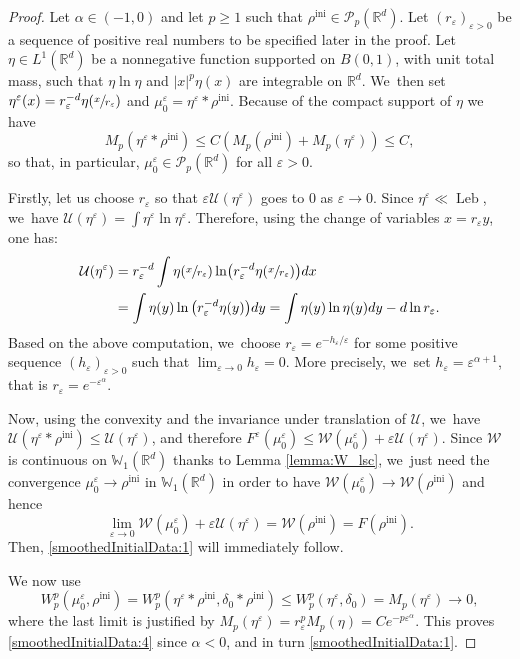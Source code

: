 \documentclass[JEP,XML,SOM,Unicode, NoFloatCountersInSection,published]{cedram}
\newcommand{\ini}{\mathrm{ini}}
\DeclareMathOperator{\Leb}{Leb}
\def\RR{\mathbb{R}}
\def\WW{\mathbb{W}}
\def\eps{\varepsilon}
\def\calP{{\mathcal P}}
\def\calU{{\mathcal U}}
\def\calW{{\mathcal W}}
\theoremstyle{plain}
\theoremstyle{definition}
\begin{document}
\begin{proof}
Let $\alpha \in (-1,0)$ and let $p \geq 1$ such that $\rho^{\ini} \in \calP_p(\RR^d)$. Let $(r_\eps)_{\eps > 0}$ be a sequence of positive real numbers to be specified later in the proof. Let $\eta \in L^1(\RR^d)$ be a nonnegative function supported on $B(0,1)$, with unit total mass, such that $\eta \ln \eta$ and $|x|^p \eta(x)$ are integrable on $\RR^d$. We~then set $\eta^\eps(x) = r_\eps^{-d} \eta(\sfrac{x}{r_\eps})$ and $\mu_0^\eps = \eta^\eps * \rho^{\ini}$. Because of the compact support of $\eta$ we have
\[
M_p(\eta^\eps * \rho^{\ini}) \leq C(M_p(\rho^{\ini})+M_p(\eta^\eps))\leq C,
\]
so that, in particular, $\mu_0^\eps \in \calP_p(\RR^d)$ for all $\eps>0$.

Firstly, let us choose $r_\eps$ so that $\eps \calU(\eta^\eps)$ goes to 0 as $\eps \to 0$. Since $\eta^\eps \ll \Leb$, we~have $\calU(\eta^\eps) = \int \eta^\eps \ln \eta^\eps$. Therefore, using the change of variables $x = r_\eps y$, one has:
\[
\begin{aligned}
\calU(\eta^\eps) &= r_\eps^{-d} \int \eta(\sfrac{x}{r_\eps}) \ln \bigl( r_\eps^{-d} \eta(\sfrac{x}{r_\eps}) \bigr) dx\\
& = \int \eta(y) \ln \big(r_\eps^{-d} \eta(y)\big) dy 
= \int \eta(y) \ln \eta(y) dy - d \ln r_\eps.
\end{aligned}
\]
Based on the above computation, we~choose $r_\eps = e^{-h_\eps / \eps}$ for some positive sequence $(h_\eps)_{\eps>0}$ such that $\lim_{\eps \to 0} h_\eps = 0$. More precisely, we~set $h_\eps = \eps^{\alpha + 1}$, that is $r_\eps = e^{-\eps^\alpha}$.

Now, using the convexity and the invariance under translation of $\calU$, we~have \hbox{$\calU(\eta^\eps * \rho^{\ini}) \leq \calU(\eta^\eps)$}, and therefore $F^\eps(\mu_0^\eps) \leq \calW(\mu_0^\eps) + \eps \calU(\eta^\eps)$. Since $\calW$ is continuous on $\WW_1(\RR^d)$ thanks to Lemma \ref{lemma:W_lsc}, we~just need the convergence $\mu_0^\eps\to\rho^{\ini}$ in $\WW_1(\RR^d)$ in order to have $\calW(\mu_0^\eps) \to \calW(\rho^{\ini})$ and hence
\[
\lim_{\eps \to 0} \calW(\mu_0^\eps) + \eps \calU(\eta^\eps) = \calW(\rho^{\ini}) = F(\rho^{\ini}).
\]
Then, \eqref{smoothedInitialData:1} will immediately follow.

We now use
\[
W_p^p(\mu_0^\eps,\rho^{\ini}) = W_p^p(\eta^\eps * \rho^{\ini}, \delta_0 * \rho^{\ini}) \leq W_p^p(\eta^\eps, \delta_0) = M_p(\eta^\eps)\to 0,
\]
where the last limit is justified by $M_p(\eta^\eps) = r_\eps^p M_p(\eta) = C e^{-p\eps^\alpha}$. This proves
\eqref{smoothedInitialData:4} since $\alpha < 0$, and in turn \eqref{smoothedInitialData:1}.
\end{proof}
\end{document}
